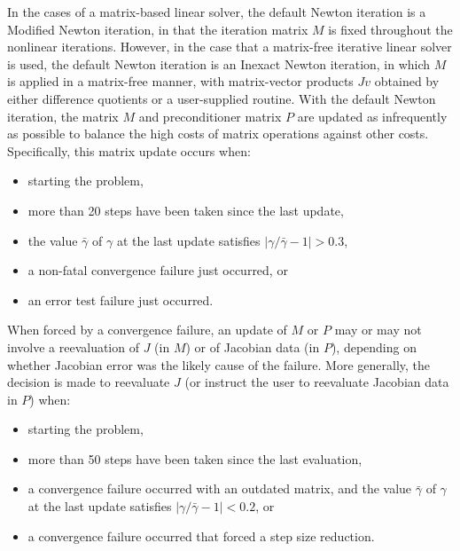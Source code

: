 In the cases of a matrix-based linear solver, the
default Newton iteration is a Modified Newton iteration, in that the iteration matrix
$M$ is fixed throughout the nonlinear iterations.  However, in the
case that a matrix-free iterative linear solver is used, the default
Newton iteration is an Inexact Newton iteration, in which $M$ is
applied in a matrix-free manner, with matrix-vector products $Jv$
obtained by either difference quotients or a user-supplied routine.
With the default Newton iteration, the matrix $M$ and preconditioner
matrix $P$ are updated as infrequently as possible to balance the high
costs of matrix operations against other costs.  Specifically, this matrix
update occurs when:
\begin{itemize}
\item starting the problem,
\item more than 20 steps have been taken since the last update,
\item the value $\bar{\gamma}$ of $\gamma$ at the last update
satisfies $|\gamma/\bar{\gamma} - 1| > 0.3$,
\item a non-fatal convergence failure just occurred, or
\item an error test failure just occurred.
\end{itemize}
When forced by a convergence failure, an update of $M$ or $P$ may or
may not involve a reevaluation of $J$ (in $M$) or of Jacobian data
(in $P$), depending on whether Jacobian error was the likely cause of
the failure.  More generally, the decision is made to reevaluate $J$
(or instruct the user to reevaluate Jacobian data in $P$) when:
\begin{itemize}
\item starting the problem,
\item more than 50 steps have been taken since the last evaluation,
\item a convergence failure occurred with an outdated matrix, and
the value $\bar{\gamma}$ of $\gamma$ at the last update
satisfies $|\gamma/\bar{\gamma} - 1| < 0.2$, or
\item a convergence failure occurred that forced a step size reduction.
\end{itemize}

